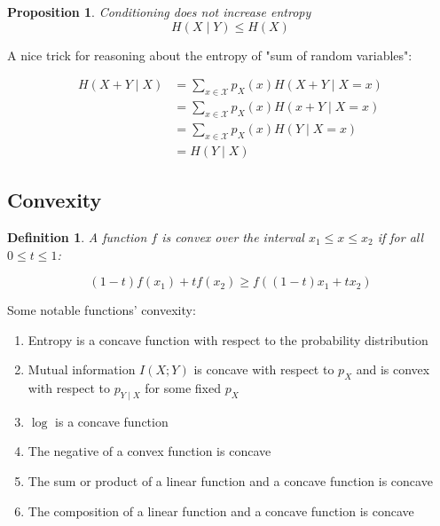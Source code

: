\documentclass{article}
\newtheorem{definition}{Definition}[section]
\newtheorem{proposition}{Proposition}[section]
\begin{document}
    \begin{proposition}
    Conditioning does not increase entropy
        \begin{equation*}
            H(X \mid Y) \leq H(X)
        \end{equation*}
    \end{proposition}

    A nice trick for reasoning about the entropy of "sum of random variables":

    $$
    \begin{aligned}
        H(X + Y \mid X) &= \sum_{x \in \mathcal{X}}p_X(x)H(X + Y \mid X=x) \\
        &= \sum_{x \in \mathcal{X}}p_X(x)H(x + Y \mid X=x) \\
        &= \sum_{x \in \mathcal{X}}p_X(x)H(Y \mid X=x) \\
        &= H(Y \mid X)
    \end{aligned}
    $$

    \subsection{Convexity}

    \begin{definition}
        A function $f$ is convex over the interval $x_1 \leq x \leq x_2$ if for all $0 \leq t \leq 1$:

        \begin{equation*}
            (1-t)f(x_1) + tf(x_2) \geq f((1-t)x_1 + tx_2)
        \end{equation*}
    \end{definition}

    Some notable functions' convexity:
    \begin{enumerate}
        \item Entropy is a concave function with respect to the probability distribution
        \item Mutual information $I(X; Y)$ is concave with respect to $p_X$ and is convex with respect to $p_{Y \mid X}$ for some fixed $p_X$
        \item $\log$ is a concave function
        \item The negative of a convex function is concave
        \item The sum or product of a linear function and a concave function is concave
        \item The composition of a linear function and a concave function is concave
    \end{enumerate}
\end{document}
